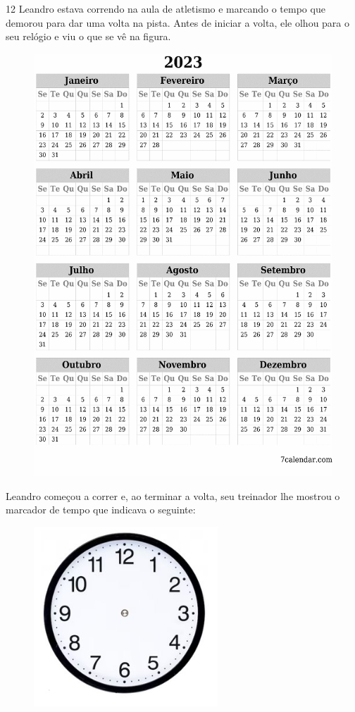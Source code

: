 \pagebreak
\num{12} Leandro estava correndo na aula de atletismo e marcando o tempo que
demorou para dar uma volta na pista. Antes de iniciar a volta, ele olhou
para o seu relógio e viu o que se vê na figura.


\begin{figure}[htpb!]
\centering
\includegraphics[width=.5\textwidth]{./media/image60.png}
\end{figure}

Leandro começou a correr e, ao terminar a volta, seu treinador lhe
mostrou o marcador de tempo que indicava o seguinte:

\begin{figure}[htpb!]
\includegraphics[width=\textwidth]{./media/image61.png}
\end{figure}

